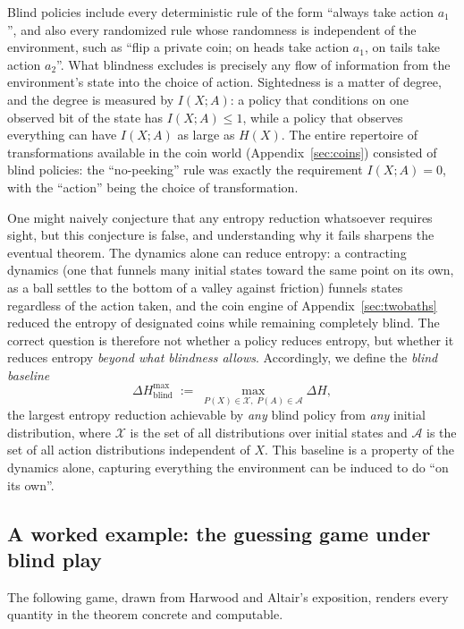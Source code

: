 \documentclass[11pt]{article}
\begin{document}
Blind policies include every deterministic rule of the form ``always take action $a_1$'', and also every randomized rule whose randomness is independent of the environment, such as ``flip a private coin; on heads take action $a_1$, on tails take action $a_2$''. What blindness excludes is precisely any flow of information from the environment's state into the choice of action. Sightedness is a matter of degree, and the degree is measured by $I(X;A)$: a policy that conditions on one observed bit of the state has $I(X;A) \le 1$, while a policy that observes everything can have $I(X;A)$ as large as $H(X)$. The entire repertoire of transformations available in the coin world (Appendix~\ref{sec:coins}) consisted of blind policies: the ``no-peeking'' rule was exactly the requirement $I(X;A) = 0$, with the ``action'' being the choice of transformation.

One might naively conjecture that any entropy reduction whatsoever requires sight, but this conjecture is false, and understanding why it fails sharpens the eventual theorem. The dynamics alone can reduce entropy: a contracting dynamics (one that funnels many initial states toward the same point on its own, as a ball settles to the bottom of a valley against friction) funnels states regardless of the action taken, and the coin engine of Appendix~\ref{sec:twobaths} reduced the entropy of designated coins while remaining completely blind. The correct question is therefore not whether a policy reduces entropy, but whether it reduces entropy \emph{beyond what blindness allows}. Accordingly, we define the \emph{blind baseline}
\[
\Delta H^{\max}_{\text{blind}} \;:=\; \max_{P(X) \in \mathcal{X},\; P(A) \in \mathcal{A}} \Delta H,
\]
the largest entropy reduction achievable by \emph{any} blind policy from \emph{any} initial distribution, where $\mathcal{X}$ is the set of all distributions over initial states and $\mathcal{A}$ is the set of all action distributions independent of $X$. This baseline is a property of the dynamics alone, capturing everything the environment can be induced to do ``on its own''.

\subsection{A worked example: the guessing game under blind play}
\label{sec:gameblind}

The following game, drawn from Harwood and Altair's exposition, renders every quantity in the theorem concrete and computable.
\end{document}

